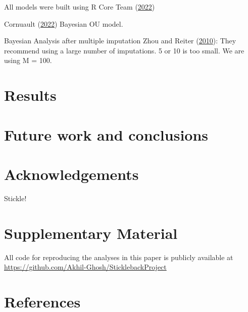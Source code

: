 \documentclass[
  12pt,
]{article}
\begin{document}
All models were built using R Core Team
(\protect\hyperlink{ref-R2022language}{2022})

Cornuault (\protect\hyperlink{ref-Cornault2022}{2022}) Bayesian OU
model.

Bayesian Analysis after multiple imputation Zhou and Reiter
(\protect\hyperlink{ref-ZhouReiter2009}{2010}): They recommend using a
large number of imputations. 5 or 10 is too small. We are using M = 100.

\hypertarget{sec:results}{%
\section{Results}\label{sec:results}}

\hypertarget{sec:conclusions}{%
\section{Future work and conclusions}\label{sec:conclusions}}

\hypertarget{acknowledgements}{%
\section*{Acknowledgements}\label{acknowledgements}}

Stickle!

\hypertarget{supplementary-material}{%
\section*{Supplementary Material}\label{supplementary-material}}

All code for reproducing the analyses in this paper is publicly
available at \url{https://github.com/Akhil-Ghosh/SticklebackProject}

\hypertarget{references}{%
\section*{References}\label{references}}
\end{document}
